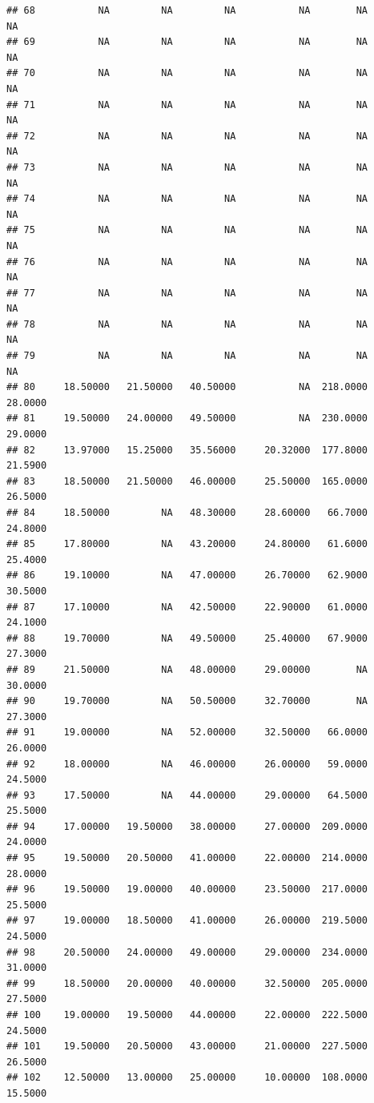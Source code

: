 \documentclass[]{article}
\begin{document}
\begin{verbatim}
## 68           NA         NA         NA           NA        NA          NA
## 69           NA         NA         NA           NA        NA          NA
## 70           NA         NA         NA           NA        NA          NA
## 71           NA         NA         NA           NA        NA          NA
## 72           NA         NA         NA           NA        NA          NA
## 73           NA         NA         NA           NA        NA          NA
## 74           NA         NA         NA           NA        NA          NA
## 75           NA         NA         NA           NA        NA          NA
## 76           NA         NA         NA           NA        NA          NA
## 77           NA         NA         NA           NA        NA          NA
## 78           NA         NA         NA           NA        NA          NA
## 79           NA         NA         NA           NA        NA          NA
## 80     18.50000   21.50000   40.50000           NA  218.0000     28.0000
## 81     19.50000   24.00000   49.50000           NA  230.0000     29.0000
## 82     13.97000   15.25000   35.56000     20.32000  177.8000     21.5900
## 83     18.50000   21.50000   46.00000     25.50000  165.0000     26.5000
## 84     18.50000         NA   48.30000     28.60000   66.7000     24.8000
## 85     17.80000         NA   43.20000     24.80000   61.6000     25.4000
## 86     19.10000         NA   47.00000     26.70000   62.9000     30.5000
## 87     17.10000         NA   42.50000     22.90000   61.0000     24.1000
## 88     19.70000         NA   49.50000     25.40000   67.9000     27.3000
## 89     21.50000         NA   48.00000     29.00000        NA     30.0000
## 90     19.70000         NA   50.50000     32.70000        NA     27.3000
## 91     19.00000         NA   52.00000     32.50000   66.0000     26.0000
## 92     18.00000         NA   46.00000     26.00000   59.0000     24.5000
## 93     17.50000         NA   44.00000     29.00000   64.5000     25.5000
## 94     17.00000   19.50000   38.00000     27.00000  209.0000     24.0000
## 95     19.50000   20.50000   41.00000     22.00000  214.0000     28.0000
## 96     19.50000   19.00000   40.00000     23.50000  217.0000     25.5000
## 97     19.00000   18.50000   41.00000     26.00000  219.5000     24.5000
## 98     20.50000   24.00000   49.00000     29.00000  234.0000     31.0000
## 99     18.50000   20.00000   40.00000     32.50000  205.0000     27.5000
## 100    19.00000   19.50000   44.00000     22.00000  222.5000     24.5000
## 101    19.50000   20.50000   43.00000     21.00000  227.5000     26.5000
## 102    12.50000   13.00000   25.00000     10.00000  108.0000     15.5000

\end{verbatim}
\end{document}
